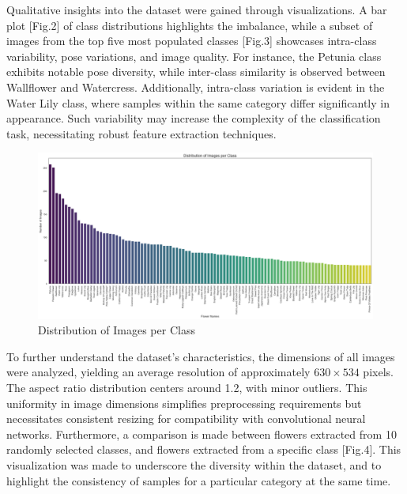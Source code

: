 Qualitative insights into the dataset were gained through visualizations. A bar plot [Fig.2] of class distributions highlights
the imbalance, while a subset of images from the top five most populated classes [Fig.3] showcases intra-class variability,
pose variations, and image quality. For instance, the Petunia class exhibits notable pose diversity, while inter-class
similarity is observed between Wallflower and Watercress. Additionally, intra-class variation is evident in the Water
Lily class, where samples within the same category differ significantly in appearance. Such variability may increase
the complexity of the classification task, necessitating robust feature extraction techniques.

\begin{figure}[h!]
    \centering
    \includegraphics[width=\linewidth]{Images/Distribution of Images per Class}
    \caption{Distribution of Images per Class}
\end{figure}

\vspace{0.3cm}

To further understand the dataset's characteristics, the dimensions of all images were analyzed, yielding an average
resolution of approximately \(630 \times 534\) pixels. The aspect ratio distribution centers around 1.2, with minor
outliers. This uniformity in image dimensions simplifies preprocessing requirements but necessitates consistent
resizing for compatibility with convolutional neural networks. Furthermore, a comparison is made between flowers
extracted from 10 randomly selected classes, and flowers extracted from a specific class [Fig.4]. This visualization was made
to underscore the diversity within the dataset, and to highlight the consistency of samples for a particular category at the same time.

